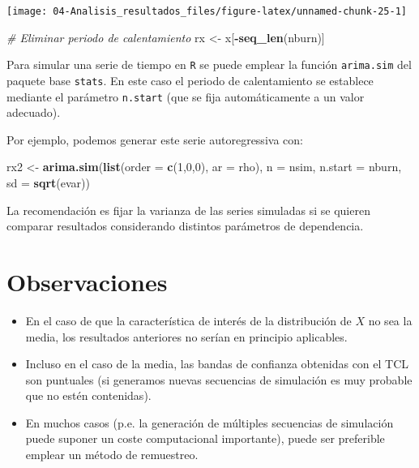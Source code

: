 \documentclass[]{book}
\newenvironment{Shaded}{\begin{snugshade}}{\end{snugshade}}
\newcommand{\KeywordTok}[1]{\textcolor[rgb]{0.13,0.29,0.53}{\textbf{#1}}}
\newcommand{\DataTypeTok}[1]{\textcolor[rgb]{0.13,0.29,0.53}{#1}}
\newcommand{\DecValTok}[1]{\textcolor[rgb]{0.00,0.00,0.81}{#1}}
\newcommand{\StringTok}[1]{\textcolor[rgb]{0.31,0.60,0.02}{#1}}
\newcommand{\CommentTok}[1]{\textcolor[rgb]{0.56,0.35,0.01}{\textit{#1}}}
\newcommand{\OperatorTok}[1]{\textcolor[rgb]{0.81,0.36,0.00}{\textbf{#1}}}
\newcommand{\NormalTok}[1]{#1}
\theoremstyle{definition}
\theoremstyle{definition}
\theoremstyle{definition}
\theoremstyle{remark}
\begin{document}
\begin{center}\texttt{[image: 04-Analisis\_resultados\_files/figure-latex/unnamed-chunk-25-1]} \end{center}

\begin{Shaded}
\begin{Highlighting}[]
\CommentTok{# Eliminar periodo de calentamiento}
\NormalTok{rx <-}\StringTok{ }\NormalTok{x[}\OperatorTok{-}\KeywordTok{seq_len}\NormalTok{(nburn)]}
\end{Highlighting}
\end{Shaded}

Para simular una serie de tiempo en \texttt{R} se puede emplear la
función \texttt{arima.sim} del paquete base \texttt{stats}. En este caso
el periodo de calentamiento se establece mediante el parámetro
\texttt{n.start} (que se fija automáticamente a un valor adecuado).

Por ejemplo, podemos generar este serie autoregressiva con:

\begin{Shaded}
\begin{Highlighting}[]
\NormalTok{rx2 <-}\StringTok{ }\KeywordTok{arima.sim}\NormalTok{(}\KeywordTok{list}\NormalTok{(}\DataTypeTok{order =} \KeywordTok{c}\NormalTok{(}\DecValTok{1}\NormalTok{,}\DecValTok{0}\NormalTok{,}\DecValTok{0}\NormalTok{), }\DataTypeTok{ar =}\NormalTok{ rho), }\DataTypeTok{n =}\NormalTok{ nsim, }\DataTypeTok{n.start =}\NormalTok{ nburn, }\DataTypeTok{sd =} \KeywordTok{sqrt}\NormalTok{(evar))}
\end{Highlighting}
\end{Shaded}

La recomendación es fijar la varianza de las series simuladas si se
quieren comparar resultados considerando distintos parámetros de
dependencia.

\section{Observaciones}\label{observaciones}

\begin{itemize}
\item
  En el caso de que la característica de interés de la distribución de
  \(X\) no sea la media, los resultados anteriores no serían en
  principio aplicables.
\item
  Incluso en el caso de la media, las bandas de confianza obtenidas con
  el TCL son puntuales (si generamos nuevas secuencias de simulación es
  muy probable que no estén contenidas).
\item
  En muchos casos (p.e. la generación de múltiples secuencias de
  simulación puede suponer un coste computacional importante), puede ser
  preferible emplear un método de remuestreo.
\end{itemize}
\end{document}
